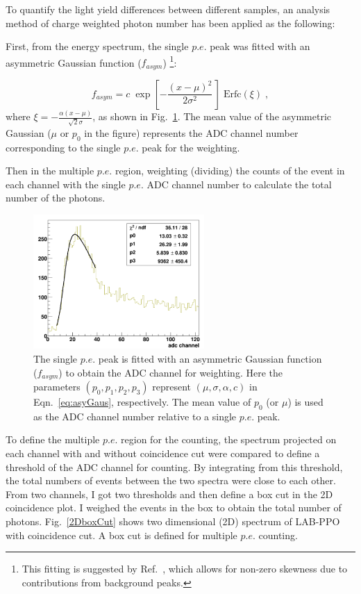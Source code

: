 To quantify the light yield differences between different samples, an analysis method of charge weighted photon number has been applied as the following:

First, from the energy spectrum, the single $p.e.$ peak was fitted with an asymmetric Gaussian function ($f_{asym}$) \footnote{This fitting is suggested by Ref.~\cite{von2016measurement}, which allows for non-zero skewness due to contributions from background peaks.}:

\begin{equation}\label{eq:asyGaus}
f_{asym}=c \; \exp\left[- \frac{(x-\mu)^2}{2 \sigma^2} \, \right] \; \mathrm{Erfc}(\xi)\; ,
\end{equation}
where $\xi=-\frac{\alpha(x-\mu)}{\sqrt 2\sigma}$,
as shown in Fig.~\ref{fitSinglePE}. The mean value of the asymmetric Gaussian ($\mu$ or $p_0$ in the figure) represents the ADC channel number corresponding to the single $p.e.$ peak for the weighting. 

Then in the multiple $p.e.$ region, weighting (dividing) the counts of the event in each channel with the single $p.e.$ ADC channel number to calculate the total number of the photons.

\begin{figure}[htbp]
	\centering	
	\includegraphics[width=6.5cm]{fitSinglePE.png}
	\caption[The single $p.e.$ peak fitted with an asymmetric Gaussian function.]{The single $p.e.$ peak is fitted with an asymmetric Gaussian function ($f_{asym}$) to obtain the ADC channel for weighting. Here the parameters $(p_0,p_1,p_2,p_3)$ represent $(\mu, \sigma, \alpha, c)$ in Eqn.~\ref{eq:asyGaus}, respectively. The mean value of $p_0$ (or $\mu$) is used as the ADC channel number relative to a single $p.e.$ peak.}
	\label{fitSinglePE}
\end{figure}

To define the multiple $p.e.$ region for the counting, the spectrum projected on each channel with and without coincidence cut were compared to define a threshold of the ADC channel for counting. By integrating from this threshold, the total numbers of events between the two spectra were close to each other. From two channels, I got two thresholds and then define a box cut in the 2D coincidence plot. I weighed the events in the box to obtain the total number of photons. Fig.~\ref{2DboxCut} shows two dimensional (2D) spectrum of LAB-PPO with coincidence cut. A box cut is defined for multiple $p.e.$ counting. 


